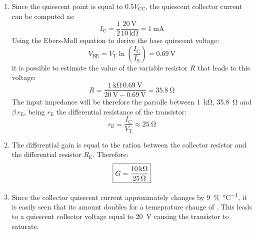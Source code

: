 \begin{enumerate}
    \item
    Since the quiescent point is equal to $0.5V_\text{CC}$, the quiescent collector current can be computed as:
    \[I_\text{C}=\frac{1}{2}\frac{\SI{20}{\volt}}{\SI{10}{\kilo\ohm}}=\SI{1}{\milli\ampere}\]
    Using the Ebers-Moll equation to derive the base quiescent voltage:
    \[V_\text{BE}=V_\text{T}\ln\left(\frac{I_\text{C}}{I_\text{S}}\right)=\SI{0.69}{\volt}\]
    it is possible to estimate the value of the variable resistor $R$ that leads to this voltage:
    \[R = \frac{\SI{1}{\kilo\ohm}\,\SI{0.69}{\volt}}{\SI{20}{\volt}-\SI{0.69}{\volt}}=\SI{35.8}{\ohm}\]
    The input impedance will be therefore the parralle between \SI{1}{\kilo\ohm}, \SI{35.8}{\ohm} and $\beta\,r_\text{E}$, being $r_\text{E}$ the differential resistance of the transistor:
    \[r_\text{E}=\frac{I_\text{C}}{V_\text{T}}\approx\SI{25}{\ohm}\]
    \item
    The differential gain is equal to the ration between the collector resistor and the differential resistor $R_\text{E}$. Therefore:
    \[\boxed{G=\frac{\SI{10}{\kilo\ohm}}{\SI{25}{\ohm}}}\]
    \item
    Since the collector quiescent current approximately changes by \SI{9}{\percent\per\celsius}, it is easily seen that its amount doubles for a temeprature change of . This leads to a quiescent collector voltage equal to \SI{20}{\volt} causing the transistor to saturate.


\end{enumerate}

